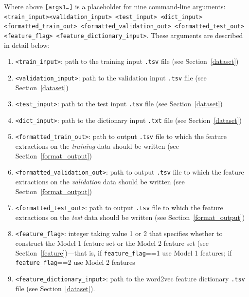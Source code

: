 \documentclass[11pt,addpoints,answers]{exam}
\begin{document}
Where above \texttt{[args1\dots]} is a placeholder for nine command-line arguments: \texttt{<train\_input>}\newline \texttt{<validation\_input> <test\_input> <dict\_input> <formatted\_train\_out> \newline <formatted\_validation\_out>  <formatted\_test\_out> <feature\_flag> \newline <feature\_dictionary\_input>}. These arguments are described in detail below:
\begin{enumerate}
    \item \texttt{<train\_input>}: path to the training input \texttt{.tsv} file (see Section~\ref{dataset})
    \item \texttt{<validation\_input>}: path to the validation input \texttt{.tsv} file (see Section~\ref{dataset})
    \item \texttt{<test\_input>}: path to the test input \texttt{.tsv} file (see Section~\ref{dataset})
    \item \texttt{<dict\_input>}: path to the dictionary input \texttt{.txt} file (see Section~\ref{dataset})
    \item \texttt{<formatted\_train\_out>}: path to output \texttt{.tsv} file to which the feature extractions on the \emph{training} data should be written (see Section~\ref{format_output})
    \item \texttt{<formatted\_validation\_out>}: path to output \texttt{.tsv} file to which the feature extractions on the \emph{validation} data should be written (see Section~\ref{format_output})
    \item \texttt{<formatted\_test\_out>}: path to output \texttt{.tsv} file to which the feature extractions on the \emph{test} data should be written (see Section~\ref{format_output})
    \item \texttt{<feature\_flag>}: integer taking value 1 or 2 that specifies whether to construct the Model 1 feature set or the Model 2 feature set (see Section~\ref{feature})---that is, if \lstinline{feature_flag}==1 use Model 1 features; if \lstinline{feature_flag}==2 use Model 2 features
    \item \texttt{<feature\_dictionary\_input>}: path to the word2vec feature dictionary \texttt{.tsv} file (see Section~\ref{dataset}). 
\end{enumerate}
\end{document}
